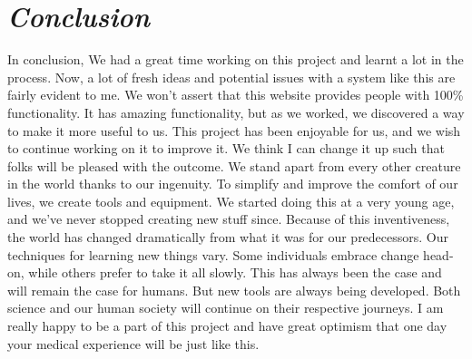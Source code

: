 \documentclass[14pt,a4paper,calibribody]{article}
\begin{document}
\section{\large{\emph{Conclusion}}}
In conclusion, We had a great time working on this project and learnt a lot in the process. Now, a lot of fresh ideas and potential issues with a system like this are fairly evident to me. We won't assert that this website provides people with 100\% functionality. It has amazing functionality, but as we worked, we discovered a way to make it more useful to us. This project has been enjoyable for us, and we wish to continue working on it to improve it. We think I can change it up such that folks will be pleased with the outcome. We stand apart from every other creature in the world thanks to our ingenuity. To simplify and improve the comfort of our lives, we create tools and equipment. We started doing this at a very young age, and we've never stopped creating new stuff since. Because of this inventiveness, the world has changed dramatically from what it was for our predecessors.  Our techniques for learning new things vary. Some individuals embrace change head-on, while others prefer to take it all slowly. This has always been the case and will remain the case for humans. But new tools are always being developed. Both science and our human society will continue on their respective journeys. I am really happy to be a part of this project and have great optimism that one day your medical experience will be just like this.
\end{document}
